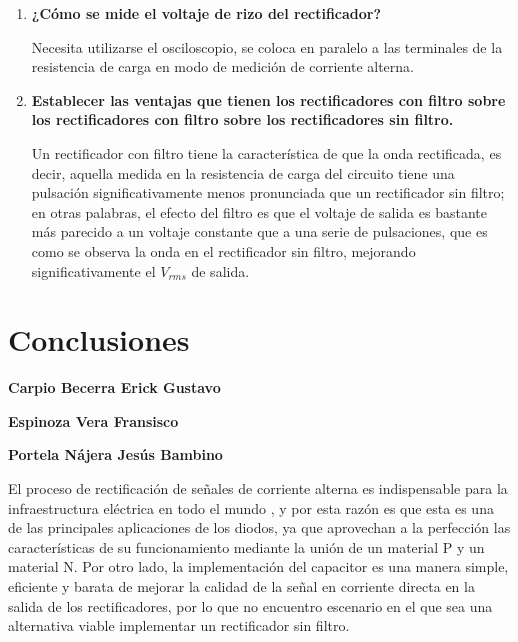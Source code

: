 \documentclass[12pt]{article}
\begin{document}
\begin{enumerate}
            \item \textbf{¿Cómo se mide el voltaje de rizo del rectificador?}\par
                Necesita utilizarse el osciloscopio, se coloca en paralelo a las terminales de la resistencia de carga en modo de medición de corriente alterna.
            \item \textbf{Establecer las ventajas que tienen los rectificadores con filtro sobre los rectificadores con filtro sobre los rectificadores sin filtro.}\par    
                Un rectificador con filtro tiene la característica de que la onda rectificada, es decir, aquella medida en la resistencia de carga del circuito tiene una pulsación significativamente menos 
                pronunciada que un rectificador sin filtro; en otras palabras, el efecto del filtro es que el voltaje de salida es bastante más parecido a un voltaje constante que a una serie de pulsaciones, que 
                es como se observa la onda en el rectificador sin filtro, mejorando significativamente el $V_{rms}$ de salida.
        \end{enumerate}

        \section*{Conclusiones}
        \label{sec:conclusiones}
        \textbf{Carpio Becerra Erick Gustavo}\par
        \textbf{Espinoza Vera Fransisco}\par
        \textbf{Portela Nájera Jesús Bambino}\par
        El proceso de rectificación de señales de corriente alterna es indispensable para la infraestructura eléctrica en todo el mundo
        , y por esta razón es que esta es una de las principales aplicaciones de los diodos, ya que aprovechan a la perfección las características de su funcionamiento 
       mediante la unión de un material P y un material N. Por otro lado, la implementación del capacitor es una manera simple, eficiente y barata de mejorar la calidad
       de la señal en corriente directa en la salida de los rectificadores, por lo que no encuentro escenario en el que sea una alternativa viable implementar un rectificador 
       sin filtro.
\end{document}
